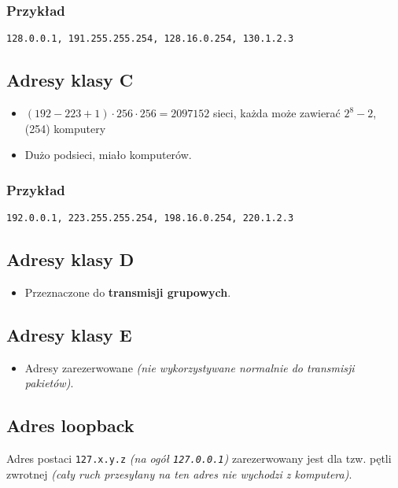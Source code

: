 \documentclass[../sk-egzamin.tex]{subfiles}
\begin{document}
\subsubsection*{Przykład}
\begin{center}
\texttt{128.0.0.1, 191.255.255.254, 128.16.0.254, 130.1.2.3}
\end{center}

\pagebreak
\subsection*{Adresy klasy C}
\begin{itemize}
    \item $(192-223+1)\cdot 256\cdot 256 = 2 097 152$ sieci,
    każda może zawierać $2^{8}-2$, (254) komputery
    \item Dużo podsieci, miało komputerów.
\end{itemize}

\subsubsection*{Przykład}
\begin{center}
\texttt{192.0.0.1, 223.255.255.254, 198.16.0.254, 220.1.2.3}
\end{center}

\subsection*{Adresy klasy D}
\begin{itemize}
    \item Przeznaczone do \textbf{transmisji grupowych}.
\end{itemize}

\subsection*{Adresy klasy E}
\begin{itemize}
    \item Adresy zarezerwowane \textit{(nie wykorzystywane normalnie do
    transmisji pakietów)}.
\end{itemize}

\subsection*{Adres loopback}
Adres postaci \texttt{127.x.y.z} \textit{(na ogół \texttt{127.0.0.1})}
zarezerwowany jest dla tzw. pętli zwrotnej \textit{(cały ruch przesyłany na ten
adres nie wychodzi z komputera)}.

\pagebreak
\end{document}
